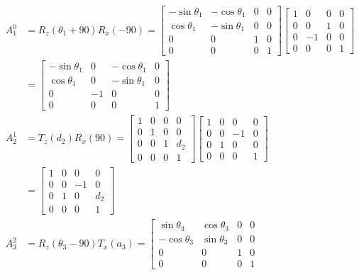 \documentclass[twoside,11pt]{homework}
\begin{document}
\begin{equation}
\begin{split}
A_1^0 &= R_z(\theta_1+90)R_x(-90) = \left[
\begin{matrix}
-\sin \theta_1 & -\cos \theta_1 & 0 & 0 \\
\cos \theta_1 & -\sin \theta_1 & 0 & 0 \\
0 & 0 & 1 & 0 \\
0 & 0 & 0 & 1
\end{matrix}
\right]
\begin{bmatrix}
1 & 0 & 0 & 0 \\
0 & 0 & 1 & 0 \\
0 & -1 & 0 & 0 \\
0 & 0 & 0 & 1 
\end{bmatrix}
\\
&= \left[
\begin{matrix}
-\sin \theta_1 & 0 & -\cos \theta_1 & 0  \\
\cos \theta_1 & 0 & -\sin \theta_1 & 0 \\
0 & -1 & 0 & 0 \\
0 & 0 & 0 & 1
\end{matrix}
\right]
\\
A_2^1 &= T_z(d_2)R_x(90) =
\begin{bmatrix}
1 & 0 & 0 & 0 \\
0 & 1 & 0& 0 \\
0 & 0 & 1 & d_2 \\
0 & 0 & 0 & 1 
\end{bmatrix}
\begin{bmatrix}
1 & 0 & 0 & 0 \\
0 & 0 & -1 & 0 \\
0 & 1 & 0 & 0 \\
0 & 0 & 0 & 1 
\end{bmatrix}
\\
&= \begin{bmatrix}
1 & 0 & 0 & 0 \\
0 & 0 & -1& 0 \\
0 & 1 & 0 &d_2\\
0 & 0 & 0 & 1 
\end{bmatrix}
\\
A_3^2 &= R_z(\theta_3-90)T_x(a_3) = 
\left[
\begin{matrix}
\sin \theta_3 & \cos \theta_3 & 0 & 0 \\
-\cos \theta_3 & \sin \theta_3 & 0 & 0 \\
0 & 0 & 1 & 0 \\
0 & 0 & 0 & 1
\end{matrix}

\end{split}
\end{equation}
\end{document}
